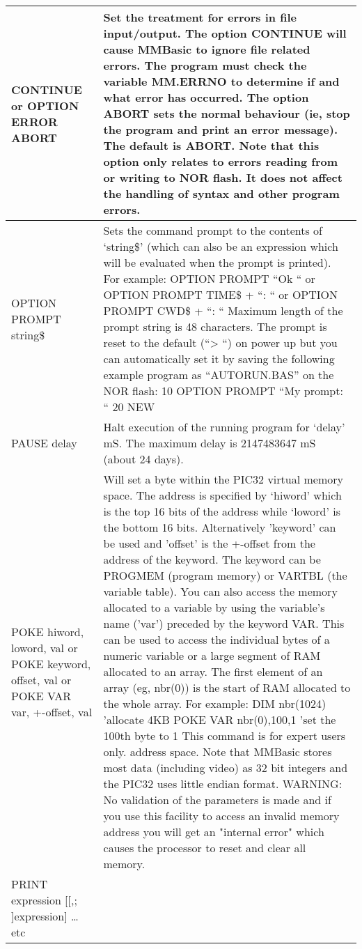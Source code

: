 \documentclass[11pt,fleqn]{book} %
\numberwithin{equation}{section} %
\numberwithin{figure}{section} %
\numberwithin{table}{section} %
\begin{document}
\begin{table}[]
\begin{tabular}{|p{4cm}|p{10cm}|}
CONTINUE
or
OPTION ERROR ABORT
 & Set the treatment for errors in file input/output. The option CONTINUE
will cause MMBasic to ignore file related errors. The program must
check the variable MM.ERRNO to determine if and what error has
occurred.
The option ABORT sets the normal behaviour (ie, stop the program and
print an error message). The default is ABORT.
Note that this option only relates to errors reading from or writing to
NOR flash. It does not affect the handling of syntax and other
program errors.
\\ \hline
OPTION PROMPT string\$ & Sets the command prompt to the contents of ‘string\$’ (which can also be
an expression which will be evaluated when the prompt is printed).
For example:
OPTION PROMPT “Ok “
or
OPTION PROMPT TIME\$ + “: “
or
OPTION PROMPT CWD\$ + “: “
Maximum length of the prompt string is 48 characters. The prompt is
reset to the default (“> “) on power up but you can automatically set it by
saving the following example program as “AUTORUN.BAS” on the
NOR flash:
10 OPTION PROMPT “My prompt: “
20 NEW
\\ \hline
PAUSE delay & Halt execution of the running program for ‘delay’ mS.
The maximum delay is 2147483647 mS (about 24 days).
\\ \hline
POKE hiword, loword, val
or
POKE keyword, offset, val
or
POKE VAR var, +-offset, val
 & Will set a byte within the PIC32 virtual memory space.
The address is specified by ‘hiword’ which is the top 16 bits of the
address while ‘loword’ is the bottom 16 bits.
Alternatively 'keyword' can be used and 'offset' is the +-offset from the
address of the keyword. The keyword can be
PROGMEM (program memory) or VARTBL (the variable table).
You can also access the memory allocated to a variable by using the
variable's name ('var') preceded by the keyword VAR. This can be used
to access the individual bytes of a numeric variable or a large segment of
RAM allocated to an array. The first element of an array (eg, nbr(0)) is
the start of RAM allocated to the whole array. For example:
DIM nbr(1024)
'allocate 4KB
POKE VAR nbr(0),100,1 'set the 100th byte to 1
This command is for expert users only. address space. Note that MMBasic stores most data (including video) as
32 bit integers and the PIC32 uses little endian format.
WARNING: No validation of the parameters is made and if you use this
facility to access an invalid memory address you will get an "internal
error" which causes the processor to reset and clear all memory.
\\ \hline
PRINT expression
[[,; ]expression] … etc

\end{tabular}
\end{table}
\end{document}
